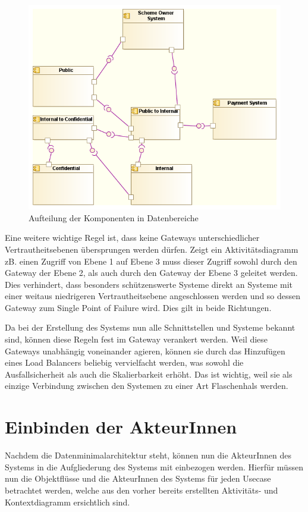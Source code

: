 \begin{figure}[H]
    \centering
    \includegraphics[scale=0.7]{uml/dataarch.png}
    \caption{Aufteilung der Komponenten in Datenbereiche}
\end{figure}

Eine weitere wichtige Regel ist, dass keine Gateways unterschiedlicher Vertrautheitsebenen übersprungen werden dürfen. Zeigt ein Aktivitätsdiagramm zB. einen Zugriff von Ebene 1 auf Ebene 3 muss dieser Zugriff sowohl durch den Gateway der Ebene 2, als auch durch den Gateway der Ebene 3 geleitet werden. Dies verhindert, dass besonders schützenswerte Systeme direkt an Systeme mit einer weitaus niedrigeren Vertrautheitsebene angeschlossen werden und so dessen Gateway zum Single Point of Failure wird. Dies gilt in beide Richtungen.

Da bei der Erstellung des Systems nun alle Schnittstellen und Systeme bekannt sind, können diese Regeln fest im Gateway verankert werden. Weil diese Gateways unabhängig voneinander agieren, können sie durch das Hinzufügen eines Load Balancers beliebig vervielfacht werden, was sowohl die Ausfallsicherheit als auch die Skalierbarkeit erhöht. Das ist wichtig, weil sie als einzige Verbindung zwischen den Systemen zu einer Art Flaschenhals werden.

\section{Einbinden der AkteurInnen}
Nachdem die Datenminimalarchitektur steht, können nun die AkteurInnen des Systems in die Aufgliederung des Systems mit einbezogen werden. Hierfür müssen nun die Objektflüsse und die AkteurInnen des Systems für jeden Usecase betrachtet werden, welche aus den vorher bereits erstellten Aktivitäts- und Kontextdiagramm ersichtlich sind.

